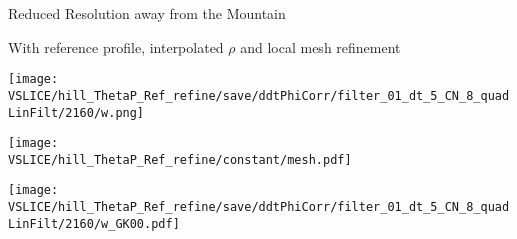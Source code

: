 \begin{slide}{Reduced Resolution away from the Mountain}

\renewcommand{\figWidth}{0.48\linewidth}

\begin{minipage}{\figWidth}
With reference profile, interpolated $\rho$ and local mesh refinement
\end{minipage}
%
\begin{minipage}{\figWidth}
\texttt{[image: \\VSLICE/hill\_ThetaP\_Ref\_refine/save/ddtPhiCorr/filter\_01\_dt\_5\_CN\_8\_quadLinFilt/2160/w.png]}
\end{minipage}

\begin{minipage}{\figWidth}
\texttt{[image: \\VSLICE/hill\_ThetaP\_Ref\_refine/constant/mesh.pdf]}
\end{minipage}
%
\begin{minipage}{\figWidth}
\texttt{[image: \\VSLICE/hill\_ThetaP\_Ref\_refine/save/ddtPhiCorr/filter\_01\_dt\_5\_CN\_8\_quadLinFilt/2160/w\_GK00.pdf]}
\end{minipage}


\end{slide}